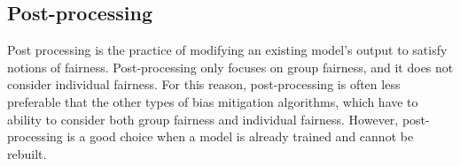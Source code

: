 \documentclass[assignment03_Solutions]{subfiles}
\begin{document}
\subsection*{Post-processing}
Post processing is the practice of modifying an existing model’s output to satisfy notions of fairness. Post-processing only focuses on group fairness, and it does not consider individual fairness. For this reason, post-processing is often less preferable that the other types of bias mitigation algorithms, which have to ability to consider both group fairness and individual fairness. However, post-processing is a good choice when a model is already trained and cannot be rebuilt.




%
%
%
%
%
%
\end{document}
